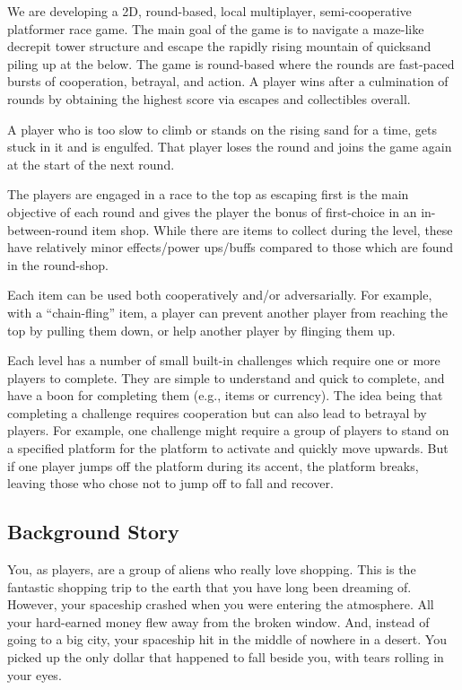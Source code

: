 We are developing a 2D, round-based, local multiplayer, semi-cooperative platformer race game. The main goal of the game is to navigate a maze-like decrepit tower structure and escape the rapidly rising mountain of quicksand piling up at the below. The game is round-based where the rounds are fast-paced bursts of cooperation, betrayal, and action. A player wins after a culmination of rounds by obtaining the highest score via escapes and collectibles overall.

A player who is too slow to climb or stands on the rising sand for a time, gets stuck in it and is engulfed. That player loses the round and joins the game again at the start of the next round.

The players are engaged in a race to the top as escaping first is the main objective of each round and gives the player the bonus of first-choice in an in-between-round item shop. While there are items to collect during the level, these have relatively minor effects/power ups/buffs compared to those which are found in the round-shop.

Each item can be used both cooperatively and/or adversarially. For example, with a ``chain-fling'' item, a player can prevent another player from reaching the top by pulling them down, or help another player by flinging them up.

Each level has a number of small built-in challenges which require one or more players to complete. They are simple to understand and quick to complete, and have a boon for completing them (e.g., items or currency). The idea being that completing a challenge requires cooperation but can also lead to betrayal by players. For example, one challenge might require a group of players to stand on a specified platform for the platform to activate and quickly move upwards. But if one player jumps off the platform during its accent, the platform breaks, leaving those who chose not to jump off to fall and recover.

\subsection{Background Story}

You, as players, are a group of aliens who really love shopping. This is the fantastic shopping trip to the earth that you have long been dreaming of. However, your spaceship crashed when you were entering the atmosphere. All your hard-earned money flew away from the broken window. And, instead of going to a big city, your spaceship hit in the middle of nowhere in a desert. You picked up the only dollar that happened to fall beside you, with tears rolling in your eyes.

